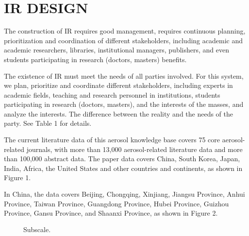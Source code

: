 \section{IR DESIGN}
The construction of IR requires good management, requires continuous planning, prioritization and coordination of different stakeholders, including academic and academic researchers, libraries, institutional managers, publishers, and even students participating in research (doctors, masters) benefits.

The existence of IR must meet the needs of all parties involved. For this system, we plan, prioritize and coordinate different stakeholders, including experts in academic fields, teaching and research personnel in institutions, students participating in research (doctors, masters), and the interests of the masses, and analyze the interests. The difference between the reality and the needs of the party. See Table 1 for details.

The current literature data of this aerosol knowledge base covers 75 core aerosol-related journals, with more than 13,000 aerosol-related literature data and more than 100,000 abstract data. The paper data covers China, South Korea, Japan, India, Africa, the United States and other countries and continents, as shown in Figure 1.

In China, the data covers Beijing, Chongqing, Xinjiang, Jiangsu Province, Anhui Province, Taiwan Province, Guangdong Province, Hubei Province, Guizhou Province, Gansu Province, and Shaanxi Province, as shown in Figure 2.

\begin{figure}
	\centering
\caption{Subscale.}
\end{figure}


